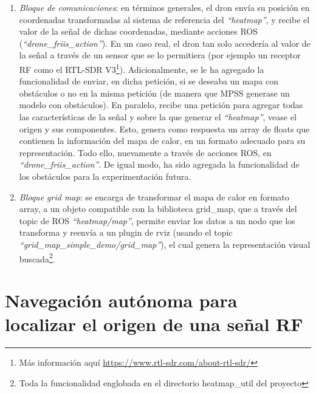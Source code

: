 \begin{enumerate}
	\item \emph{Bloque de comunicaciones}: en términos generales, el dron envía su posición en coordenadas transformadas al sistema de referencia del \emph{``heatmap''}, y recibe el valor de la señal de dichas coordenadas, mediante acciones \ac{ROS} (\emph{``drone\_friis\_action''}). En un caso real, el dron tan solo accedería al valor de la señal a través de un sensor que se lo permitiera (por ejemplo un receptor \ac{RF} como el RTL-SDR V3\footnote[1]{Más información aquí \url{https://www.rtl-sdr.com/about-rtl-sdr/}}). Adicionalmente, se le ha agregado la funcionalidad de enviar, en dicha petición, si se deseaba un mapa con obstáculos o no en la misma petición (de manera que \ac{MPSS} generase un modelo con obstáculos). En paralelo, recibe una petición para agregar todas las características de la señal y sobre la que generar el \emph{``heatmap''}, vease el origen y sus componentes. Esto, genera como respuesta un array de floats que contienen la información del mapa de calor, en un formato adecuado para su representación. Todo ello, nuevamente a través de acciones \ac{ROS}, en \emph{``drone\_friis\_action''}. De igual modo, ha sido agregada la funcionalidad de los obstáculos para la experimentación futura.
	\item \emph{Bloque grid map}: se encarga de transformar el mapa de calor en formato array, a un objeto compatible con la biblioteca grid\_map, que a través del topic de \ac{ROS} \emph{``heatmap/map''}, permite enviar los datos a un nodo que los transforma y reenvía a un plugin de rviz (usando el topic \emph{``grid\_map\_simple\_demo/grid\_map''}), el cual genera la representación visual buscada\footnote[4]{Toda la funcionalidad englobada en el directorio heatmap\_util del proyecto}.
\end{enumerate}

\section{Navegación autónoma para localizar el origen de una señal \ac{RF}}
\label{sec:signal_follow}

